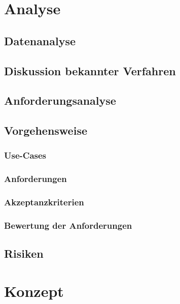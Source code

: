 \documentclass[oneside,11pt,parskip=half,ngerman]{scrreprt}
\begin{document}
\chapter{Analyse}\label{analyse}

\section{Datenanalyse}\label{datenanalyse}

\section{Diskussion bekannter
Verfahren}\label{diskussion-bekannter-verfahren}

\section{Anforderungsanalyse}\label{anforderungsanalyse}

\section{Vorgehensweise}\label{vorgehensweise}

\subsection{Use-Cases}\label{use-cases}

\subsection{Anforderungen}\label{anforderungen}

\subsection{Akzeptanzkriterien}\label{akzeptanzkriterien}

\subsection{Bewertung der
Anforderungen}\label{bewertung-der-anforderungen}

\section{Risiken}\label{risiken}

\chapter{Konzept}\label{konzept}
\end{document}
